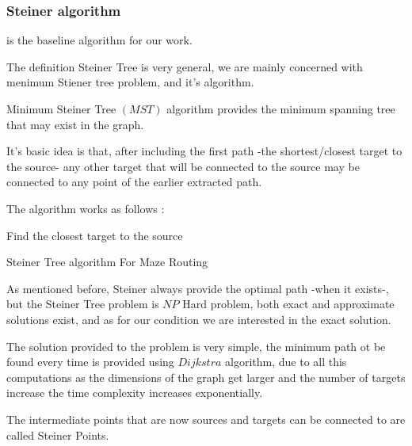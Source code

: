     \subsubsection{Steiner algorithm}
    \label{SteinerSection}
    is the baseline algorithm for our work.

    The definition Steiner Tree is very general, we are mainly concerned with menimum Stiener tree problem,
    and it's algorithm.

    Minimum Steiner Tree $(MST)$ algorithm provides the minimum spanning tree that may exist in the graph.

    It's basic idea is that, after including the first path -the shortest/closest target to the source-
    any other target that will be connected to the source may be connected to any point of the 
    earlier extracted path.

    The algorithm works as follows \cite{SteinerRef}:
    \newline
    \begin{algorithm}[]
        \SetAlgoLined
        Find the closest target to the source\;
         \caption{Steiner Tree algorithm For Maze Routing}
    \end{algorithm}
        
    As mentioned before, Steiner always provide the optimal path -when it exists-,
    but the Steiner Tree problem is $NP$ Hard problem, both exact and approximate solutions exist,
    and as for our condition we are interested in the exact solution.

    The solution provided to the problem is very simple, the minimum path ot be found 
    every time is provided using $Dijkstra$ algorithm, due to all this computations as the dimensions of the graph get larger and the number
    of targets increase the time complexity increases exponentially.

    The intermediate points that are now sources and targets can be connected to are called
    Steiner Points.

